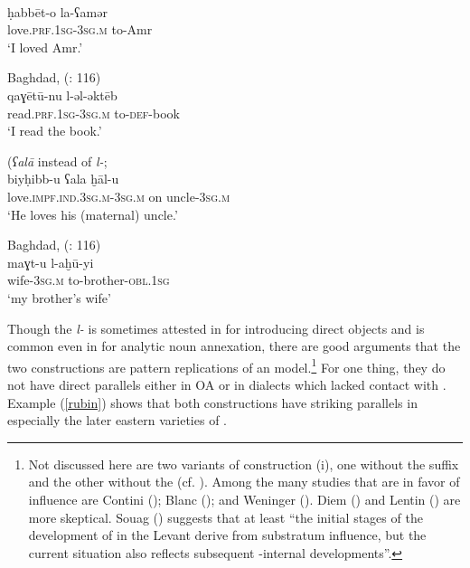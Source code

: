 \documentclass[output=paper]{langsci/langscibook}
\begin{document}
\ea
{ \citep[144]{Berlinches2016}} \\
\gll ḥabbēt-o la-ʕamər\\
     love.\textsc{prf.1sg}-\textsc{3sg.m} to-Amr\\
\glt ‘I loved Amr.’ \label{damas}
\z

\ea 
{Baghdad,  (\citealt{Abu-Haidar1991}: 116)}\\
\gll  qaɣētū-nu l-əl-əktēb\\
     read.\textsc{prf.1sg}{}-\textsc{3sg.m} to-\textsc{def}{}-book\\
\glt ‘I read the book.’
\z

\ea 
{  (\textit{ʕalā} instead of \textit{l-}; \citealt[158]{Procházka2002Cukurova}}\\
\gll   biyḥibb-u ʕala ḫāl-u\\
     love.\textsc{impf.ind.3sg.m}{}-\textsc{3sg.m} on uncle-\textsc{3sg.m}\\
\glt ‘He loves his (maternal) uncle.’ \label{cilic}
\z

\ea 
{Baghdad,  (\citealt{Abu-Haidar1991}: 116)} \\
\gll maɣt-u l-aḫū-yi\\
     wife\textsc{-3sg.m} to-brother-\textsc{obl.1sg}\\
\glt ‘my brother’s wife’ \label{christ}
\z

Though the  \textit{l-} is sometimes attested in   for introducing direct objects and is common even in   for analytic noun annexation, there are good arguments that the two constructions are pattern replications of an  model.\footnote{Not discussed here are two variants of construction (i), one without the suffix and the other without the  (cf. \citealt[203]{Lentin2018}). Among the many studies that are in favor of  influence are Contini (\citeyear[105]{Contini1999}); Blanc (\citeyear[130]{Blanc1964}); and Weninger (\citeyear[750]{Weninger2011Aramaic}). Diem (\citeyear[47--49]{Diem1979}) and Lentin (\citeyear{Lentin2018}) are more skeptical. Souag (\citeyear[52]{Souag2017clitic}) suggests that at least “the initial stages of the development of  in the Levant derive from  substratum influence, but the current situation also reflects subsequent -internal developments”.} For one thing, they do not have direct parallels either in OA or in dialects which lacked contact with . Example (\ref{rubin}) shows that both constructions have striking parallels in especially the later eastern varieties of  \citep[94--104]{Rubin2005}. 
\end{document}
